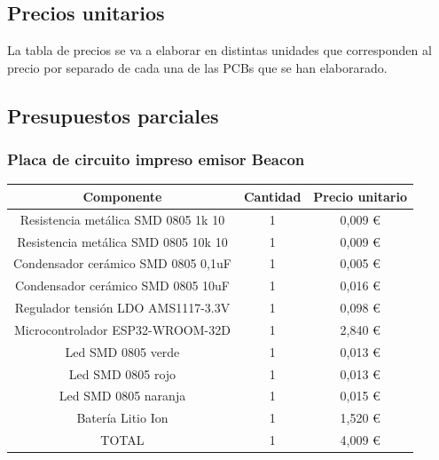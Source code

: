 \documentclass[paper=a4, fontsize=11pt,twoside]{scrartcl}	%
\begin{document}
    \subsection{Precios unitarios}
        La tabla de precios se va a elaborar en distintas unidades que corresponden al precio por separado de cada
        una de las PCBs que se han elaborarado.
    \subsection{Presupuestos parciales}
            \subsubsection{Placa de circuito impreso emisor Beacon}
                \begin{center}
                    \begin{tabular}{||c | c |c ||} 
                    \hline
                    Componente & Cantidad & Precio unitario  \\ [0.5ex] 
                    \hline
                    Resistencia metálica SMD 0805 1k 10  	&1&	 0,009 € \\ 
                    Resistencia metálica SMD 0805 10k 10 	&1&	 0,009 € \\ 
                    Condensador cerámico SMD 0805 0,1uF  	&1&	 0,005 € \\ 
                    Condensador cerámico SMD 0805 10uF   	&1&	 0,016 € \\ 
                    Regulador tensión LDO AMS1117-3.3V   	&1&	 0,098 € \\ 
                    Microcontrolador ESP32-WROOM-32D     	&1&	 2,840 € \\ 
                    Led SMD 0805 verde                   	&1&	 0,013 € \\ 
                    Led SMD 0805 rojo                    	&1&	 0,013 € \\ 
                    Led SMD 0805 naranja                 	&1&	 0,015 € \\ 
                    Batería Litio Ion                    	&1&	 1,520 € \\ 
                    \hline
                    TOTAL                    	            &1&	 4,009 € \\ 

                \hline
                    \end{tabular}
                \end{center}
\end{document}
